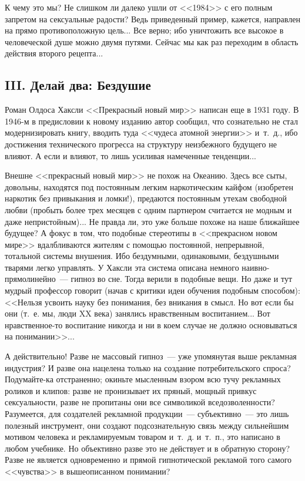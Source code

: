 \documentclass{scrbook}
\newcommand{\flqq}{<<}
\newcommand{\frqq}{>>}
\newcommand{\mdash}{~--- }
\newcommand{\essaysection}[1]{\subsection*{#1}\nopagebreak}
\begin{document}
К чему это мы? Не слишком ли далеко ушли от {\flqq}1984{\frqq} с его полным запретом на сексуальные радости? Ведь приведенный пример, кажется, направлен на прямо противоположную цель... Все верно; ибо уничтожить все высокое в человеческой душе можно двумя путями. Сейчас мы как раз переходим в область действия второго рецепта... 
       
\essaysection{III. Делай два: Бездушие}
       
Роман Олдоса Хаксли {\flqq}Прекрасный новый мир{\frqq} написан еще в 1931 году. В 1946-м в предисловии к новому изданию автор сообщил, что сознательно не стал модернизировать книгу, вводить туда {\flqq}чудеса атомной энергии{\frqq} и~т.~д., ибо достижения технического прогресса на структуру неизбежного будущего не влияют. А если и влияют, то лишь усиливая намеченные тенденции...

Внешне {\flqq}прекрасный новый мир{\frqq} не похож на Океанию. Здесь все сыты, довольны, находятся под постоянным легким наркотическим кайфом (изобретен наркотик без привыкания и ломки!), предаются постоянным утехам свободной любви (пробыть более трех месяцев с одним партнером считается не модным и даже непристойным)... Не правда ли, это уже больше похоже на наше ближайшее будущее? А фокус в том, что подобные стереотипы в {\flqq}прекрасном новом мире{\frqq} вдалбливаются жителям с помощью постоянной, непрерывной, тотальной системы внушения. Ибо бездумными, одинаковыми, бездушными тварями легко управлять. У Хаксли эта система описана немного наивно-прямолинейно{\mdash}гипноз во сне. Тогда верили в подобные вещи. Но даже и тут мудрый профессор говорит (начав с критики идеи обучения подобным способом): {\flqq}Нельзя усвоить науку без понимания, без вникания в смысл. Но вот если бы они (т.~е. мы, люди XX века) занялись нравственным воспитанием... Вот нравственное-то воспитание никогда и ни в коем случае не должно основываться на понимании{\frqq}...

А действительно! Разве не массовый гипноз{\mdash}уже упомянутая выше рекламная индустрия? И разве она нацелена только на создание потребительского спроса? Подумайте-ка отстраненно; окиньте мысленным взором всю тучу рекламных роликов и клипов: разве не пронизывает их пряный, мощный привкус сексуальности, разве не пропитаны они все символикой вседозволенности? Разумеется, для создателей рекламной продукции{\mdash}субъективно{\mdash}это лишь полезный инструмент, они создают подсознательную связь между сильнейшим мотивом человека и рекламируемым товаром и~т.~д. и~т.~п., это написано в любом учебнике. Но объективно разве это не действует и в обратную сторону? Разве не является одновременно и прямой гипнотической рекламой того самого {\flqq}чувства{\frqq} в вышеописанном понимании?
\end{document}
